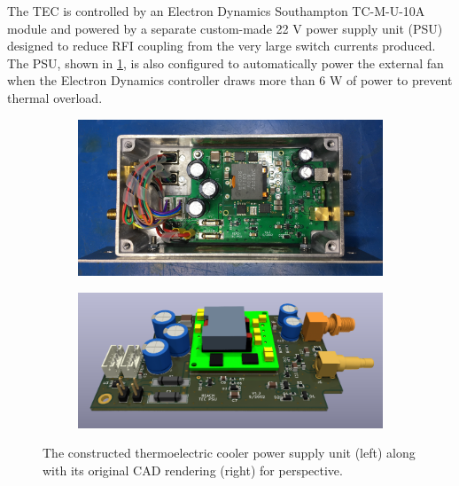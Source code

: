The TEC is controlled by an Electron Dynamics Southampton TC-M-U-10A module and powered by a separate custom-made 22 V power supply unit (PSU) designed to reduce RFI coupling from the very large switch currents produced. The PSU, shown in \cref{fig:psu}, is also configured to automatically power the external fan when the Electron Dynamics controller draws more than 6 W of power to prevent thermal overload.
\begin{figure}
    \centering
    \begin{subfigure}{.45\textwidth}
        \centering
        \includegraphics[width=\linewidth]{psu}
    \end{subfigure}
    \hfill
    \begin{subfigure}{.52\textwidth}
    \centering
        \includegraphics[width=\linewidth]{cad_psu}
    \end{subfigure}
    \caption{The constructed thermoelectric cooler power supply unit (left) along with its original CAD rendering (right) for perspective.}
    \label{fig:psu}
\end{figure}


